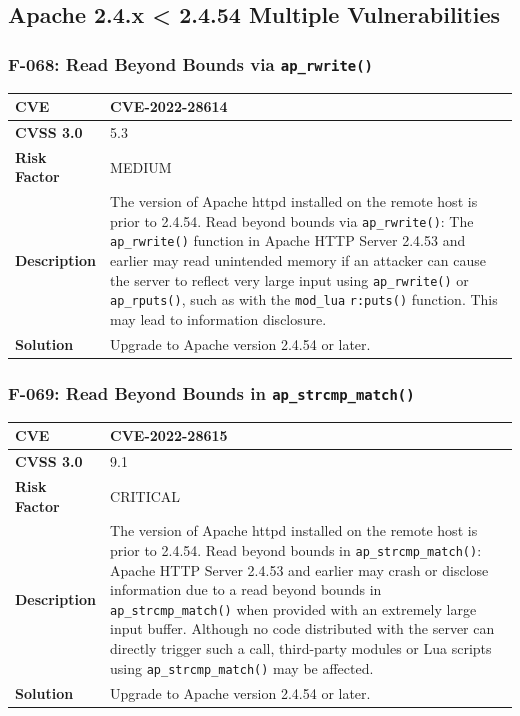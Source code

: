 %
%
\subsection{Apache 2.4.x < 2.4.54 Multiple Vulnerabilities}

\subsubsection{F-068: Read Beyond Bounds via \texttt{ap\_rwrite()}}
\begin{tabular}{|p{2.8cm}|p{12.2cm}|}
\hline
\textbf{CVE} & CVE-2022-28614 \\ \hline
\textbf{CVSS 3.0} & 5.3 \\ \hline
\textbf{Risk Factor} & MEDIUM \\ \hline
\textbf{Description} & The version of Apache httpd installed on the remote host is prior to 2.4.54. Read beyond bounds via \texttt{ap\_rwrite()}: The \texttt{ap\_rwrite()} function in Apache HTTP Server 2.4.53 and earlier may read unintended memory if an attacker can cause the server to reflect very large input using \texttt{ap\_rwrite()} or \texttt{ap\_rputs()}, such as with the \texttt{mod\_lua} \texttt{r:puts()} function. This may lead to information disclosure. \\ \hline
\textbf{Solution} & Upgrade to Apache version 2.4.54 or later. \\ \hline
\end{tabular}

\subsubsection{F-069: Read Beyond Bounds in \texttt{ap\_strcmp\_match()}}
\begin{tabular}{|p{2.8cm}|p{12.2cm}|}
\hline
\textbf{CVE} & CVE-2022-28615 \\ \hline
\textbf{CVSS 3.0} & 9.1 \\ \hline
\textbf{Risk Factor} & CRITICAL \\ \hline
\textbf{Description} & The version of Apache httpd installed on the remote host is prior to 2.4.54. Read beyond bounds in \texttt{ap\_strcmp\_match()}: Apache HTTP Server 2.4.53 and earlier may crash or disclose information due to a read beyond bounds in \texttt{ap\_strcmp\_match()} when provided with an extremely large input buffer. Although no code distributed with the server can directly trigger such a call, third-party modules or Lua scripts using \texttt{ap\_strcmp\_match()} may be affected. \\ \hline
\textbf{Solution} & Upgrade to Apache version 2.4.54 or later. \\ \hline
\end{tabular}

